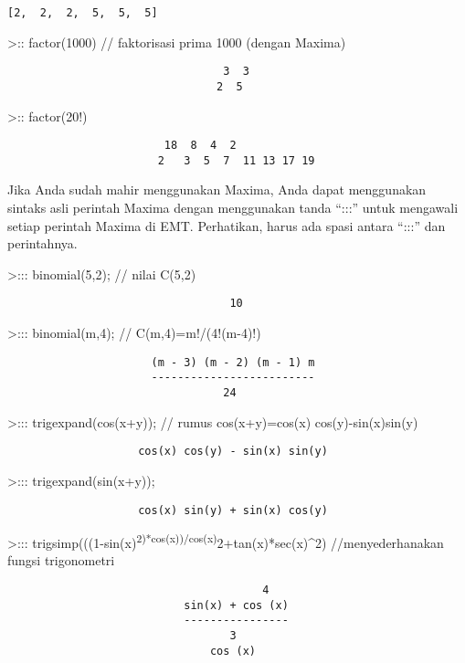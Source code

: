 \documentclass[
]{book}
\begin{document}
\begin{verbatim}
[2,  2,  2,  5,  5,  5]
\end{verbatim}

\textgreater:: factor(1000) // faktorisasi prima 1000 (dengan Maxima)

\begin{verbatim}
                                 3  3
                                2  5
\end{verbatim}

\textgreater:: factor(20!)

\begin{verbatim}
                        18  8  4  2
                       2   3  5  7  11 13 17 19
\end{verbatim}

Jika Anda sudah mahir menggunakan Maxima, Anda dapat menggunakan sintaks asli perintah Maxima dengan menggunakan tanda ``:::'' untuk mengawali setiap perintah Maxima di EMT. Perhatikan, harus ada spasi antara ``:::'' dan perintahnya.

\textgreater::: binomial(5,2); // nilai C(5,2)

\begin{verbatim}
                                  10
\end{verbatim}

\textgreater::: binomial(m,4); // C(m,4)=m!/(4!(m-4)!)

\begin{verbatim}
                      (m - 3) (m - 2) (m - 1) m
                      -------------------------
                                 24
\end{verbatim}

\textgreater::: trigexpand(cos(x+y)); // rumus cos(x+y)=cos(x) cos(y)-sin(x)sin(y)

\begin{verbatim}
                    cos(x) cos(y) - sin(x) sin(y)
\end{verbatim}

\textgreater::: trigexpand(sin(x+y));

\begin{verbatim}
                    cos(x) sin(y) + sin(x) cos(y)
\end{verbatim}

\textgreater::: trigsimp(((1-sin(x)\textsuperscript{2)*cos(x))/cos(x)}2+tan(x)*sec(x)\^{}2) //menyederhanakan fungsi trigonometri

\begin{verbatim}
                                       4
                           sin(x) + cos (x)
                           ----------------
                                  3
                               cos (x)
\end{verbatim}
\end{document}
